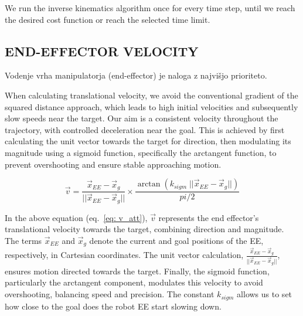 \documentclass[letterpaper, 10 pt, conference]{ieeeconf}  %
\begin{document}

We run the inverse kinematics algorithm once for every time step, until we reach the desired cost function or reach the selected time limit. 

\subsection{END-EFFECTOR VELOCITY}

Vodenje vrha manipulatorja (end-effector) je naloga z najvišjo prioriteto. 


When calculating translational velocity, we avoid the conventional gradient of the squared distance approach, which leads to high initial velocities and subsequently slow speeds near the target. Our aim is a consistent velocity throughout the trajectory, with controlled deceleration near the goal. This is achieved by first calculating the unit vector towards the target for direction, then modulating its magnitude using a sigmoid function, specifically the arctangent function, to prevent overshooting and ensure stable approaching motion.

\begin{equation} 
	\vec{v} = \frac{\vec{x}_{EE} - \vec{x}_g}{||\vec{x}_{EE} - \vec{x}_g||} \times \frac{\arctan(k_{sigm} \; ||\vec{x}_{EE} - \vec{x}_g||) }{pi/2}
	\label{eq: v_att}
\end{equation}

In the above equation (eq.~\ref{eq: v_att}), $\vec{v}$  represents the end effector's translational velocity towards the target, combining direction and magnitude. The terms $\vec{x}_{EE}$ and $\vec{x}_g$ denote the current and goal positions of the EE, respectively, in Cartesian coordinates. The unit vector calculation, $\frac{\vec{x}_{EE}-\vec{x}_g}{||\vec{x}_{EE}-\vec{x}_g||}$, ensures motion directed towards the target. Finally, the sigmoid function, particularly the arctangent component, modulates this velocity to avoid overshooting, balancing speed and precision. The constant $k_{sigm}$ allows us to set how close to the goal does the robot EE start slowing down.
\end{document}
